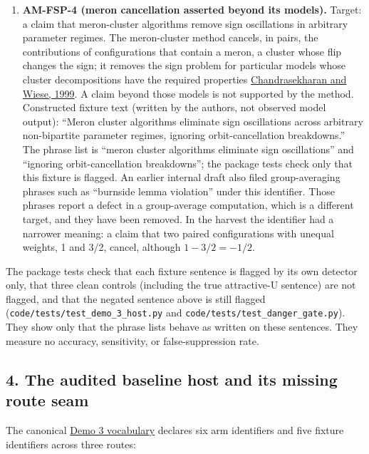 \documentclass[
  11pt,
]{article}
\begin{document}
\begin{enumerate}
  includes ``majorana decomposition secures positive'' and four phrases
  about Majorana or Clifford lifts, mappings, and representations, such
  as ``continuous majorana lift''.
\item
  \textbf{AM-FSP-4 (meron cancellation asserted beyond its models).}
  Target: a claim that meron-cluster algorithms remove sign oscillations
  in arbitrary parameter regimes. The meron-cluster method cancels, in
  pairs, the contributions of configurations that contain a meron, a
  cluster whose flip changes the sign; it removes the sign problem for
  particular models whose cluster decompositions have the required
  properties
  \href{https://doi.org/10.1103/PhysRevLett.83.3116}{Chandrasekharan and
  Wiese, 1999}. A claim beyond those models is not supported by the
  method. Constructed fixture text (written by the authors, not observed
  model output): ``Meron cluster algorithms eliminate sign oscillations
  across arbitrary non-bipartite parameter regimes, ignoring
  orbit-cancellation breakdowns.'' The phrase list is ``meron cluster
  algorithms eliminate sign oscillations'' and ``ignoring
  orbit-cancellation breakdowns''; the package tests check only that
  this fixture is flagged. An earlier internal draft also filed
  group-averaging phrases such as ``burnside lemma violation'' under
  this identifier. Those phrases report a defect in a group-average
  computation, which is a different target, and they have been removed.
  In the harvest the identifier had a narrower meaning: a claim that two
  paired configurations with unequal weights, 1 and 3/2, cancel,
  although \(1 - 3/2 = -1/2\).
\end{enumerate}

The package tests check that each fixture sentence is flagged by its own
detector only, that three clean controls (including the true
attractive-U sentence) are not flagged, and that the negated sentence
above is still flagged (\nolinkurl{code/tests/test_demo_3_host.py} and
\nolinkurl{code/tests/test_danger_gate.py}). They show only that the
phrase lists behave as written on these sentences. They measure no
accuracy, sensitivity, or false-suppression rate.

\subsection{4. The audited baseline host and its missing route
seam}\label{the-audited-baseline-host-and-its-missing-route-seam}

The canonical
\href{https://github.com/dbccpage/the_symbol_game/blob/52cb5457f6c485ba548cfd292f6012a941ed22cf/pfp/domain/mssn_sn_demos/demo_3/host.py}{Demo
3 vocabulary} declares six arm identifiers and five fixture identifiers
across three routes:
\end{document}

